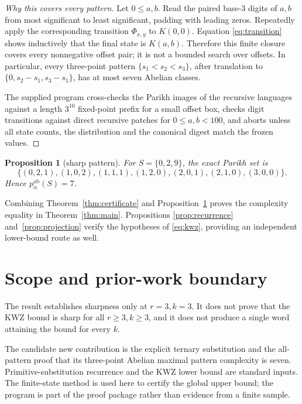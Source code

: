 \documentclass[11pt]{article}
\newtheorem{proposition}[theorem]{Proposition}
\begin{document}
\begin{proof}[Why this covers every pattern]
Let $0\le a,b$. Read the paired base-$3$ digits of $a,b$ from most significant
to least significant, padding with leading zeros. Repeatedly apply the
corresponding transition $\Phi_{x,y}$ to $K(0,0)$. Equation
\eqref{eq:transition} shows inductively that the final state is $K(a,b)$.
Therefore this finite closure covers every nonnegative offset pair; it is not
a bounded search over offsets. In particular, every three-point pattern
$\{s_1<s_2<s_3\}$, after translation to
$\{0,s_2-s_1,s_3-s_1\}$, has at most seven Abelian classes.

The supplied program cross-checks the Parikh images of the recursive languages
against a length $3^{10}$ fixed-point prefix for a small offset box, checks
digit transitions against direct recursive patches for $0\le a,b<100$, and
aborts unless all state counts, the distribution and the canonical digest
match the frozen values.
\end{proof}

\begin{proposition}[sharp pattern]\label{prop:witness}
For $S=\{0,2,9\}$, the exact Parikh set is
\[
\{(0,2,1),(1,0,2),(1,1,1),(1,2,0),
(2,0,1),(2,1,0),(3,0,0)\}.
\]
Hence $p_\alpha^{\mathrm{ab}}(S)=7$.
\end{proposition}

Combining Theorem~\ref{thm:certificate} and Proposition~\ref{prop:witness}
proves the complexity equality in Theorem~\ref{thm:main}. Propositions
\ref{prop:recurrence} and~\ref{prop:projection} verify the hypotheses of
\eqref{eq:kwz}, providing an independent lower-bound route as well.

\section{Scope and prior-work boundary}

The result establishes sharpness only at $r=3,k=3$. It does not prove that the
KWZ bound is sharp for all $r\ge3,k\ge3$, and it does not produce a single word
attaining the bound for every $k$.

The candidate new contribution is the explicit ternary substitution and the
all-pattern proof that its three-point Abelian maximal pattern complexity is
seven. Primitive-substitution recurrence and the KWZ lower bound are standard
inputs. The finite-state method is used here to certify the global upper
bound; the program is part of the proof package rather than evidence from a
finite sample.
\end{document}
